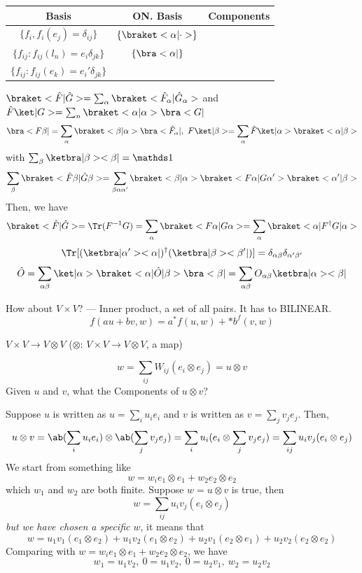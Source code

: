 \begin{table}[!htbp]
  \centering
  \begin{tabular}{ccc}
    \toprule
    Basis & ON. Basis & Components\\
    \midrule
    $\{f_i, f_i(e_j) = \delta_{ij}\}$ & $\{\braket<\alpha|\cdot>\}$\\
    $\{f_{ij}: f_{ij}(l_n) = e_i\delta_{jk}\}$ & $\{\bra<\alpha|\}$\\
    $\{f_{ij}: f_{ij}(e_k) = e_i'\delta_{jk}\}$ & \\
    \bottomrule
  \end{tabular}
\end{table}
$\braket<\hat F|\hat G> = \sum_\alpha \braket<\hat F_\alpha|\hat G_\alpha>$
and $\hat F\ket|G> = \sum_n \braket<\alpha|\alpha>\bra<G|$
\[
  \bra<F\beta| = \sum_\alpha \braket<\beta|\alpha>\bra<\hat F_\alpha|,~
  F\ket|\beta> = \sum_\alpha \hat F \ket|\alpha>\braket<\alpha|\beta>
\]
with $\sum_\beta \ketbra|\beta><\beta| = \identity$
\[
  \sum_\beta \braket<\hat F\beta|\hat G\beta>
  = \sum_{\beta\alpha\alpha'}\braket<\beta|\alpha>\braket<F\alpha|G\alpha'>\braket<\alpha'|\beta>
\]
Then, we have
\[
  \braket<\hat F|\hat G> = \Tr(F^{-1}G) = \sum_\alpha\braket<F\alpha|G\alpha> = \sum_\alpha \braket<\alpha|F^\dagger G|\alpha>
\]
\[
  \Tr[(\ketbra|\alpha'><\alpha|)^\dagger(\ketbra|\beta><\beta'|)] = \delta_{\alpha\beta}\delta_{\alpha'\beta'}
\]
\[
  \hat O = \sum_{\alpha\beta} \ket|\alpha>\braket<\alpha|\hat O|\beta>\bra<\beta|
  = \sum_{\alpha\beta} O_{\alpha\beta}\ketbra|\alpha><\beta|
\]

How about $V \times V$? --- Inner product, a set of all pairs. It has to BILINEAR.
\[
  f(au+bv,w) = a^*f(u,w) +*b^f(v,w)
\]

$V \times V \to V \otimes V$ ($\otimes$: $V \times V \to V \otimes V$, a map)

\[w = \sum_{ij} W_{ij} (e_i \otimes e_j) = u \otimes v\]
Given $u$ and $v$, what the Components of $u \otimes v$?

Suppose $u$ is written as $u = \sum_i u_i e_i$ and $v$ is written as $v = \sum_j v_j e_j$. Then,
\[
  u \otimes v = \ab(\sum_i u_i e_i) \otimes \ab(\sum_j v_j e_j)
= \sum_i u_i (e_i \otimes \sum_j v_j e_j)
= \sum_{ij} u_iv_j (e_i \otimes e_j)
\]
We start from something like
\[
  w = w_ie_1\otimes e_1 + w_2 e_2 \otimes e_2
\]
which $w_1$ and $w_2$ are both finite.
Suppose $w = u \otimes v$ is true, then
\[
  w = \sum_{ij} u_iv_j (e_i \otimes e_j)
\]
\emph{but we have chosen a specific $w$}, it means that
\[
  w = u_1v_1(e_1 \otimes e_2) + u_1v_2(e_1\otimes e_2) + u_2v_1(e_2\otimes e_1) + u_2v_2(e_2\otimes e_2)
\]
Comparing with $w = w_ie_1\otimes e_1 + w_2 e_2 \otimes e_2$, we have
\[
  w_1 = u_1v_2, ~ 0 = u_1v_2, ~ 0 = u_2v_1, ~ w_2 = u_2v_2
\]

